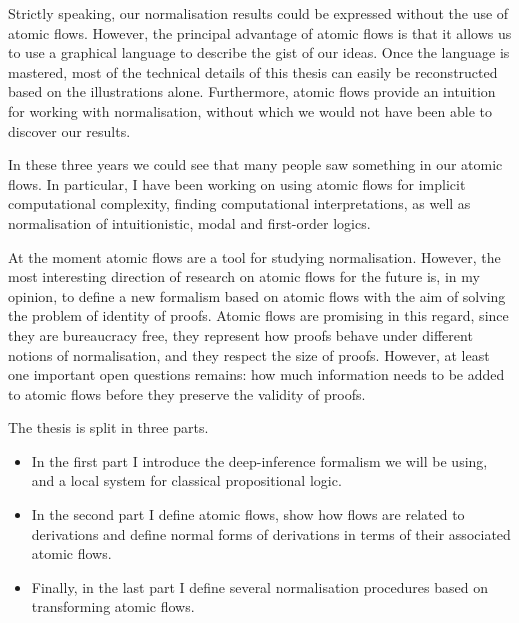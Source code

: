 Strictly speaking, our normalisation results could be expressed without the use of atomic flows. However, the principal advantage of atomic flows is that it allows us to use a graphical language to describe the gist of our ideas. Once the language is mastered, most of the technical details of this thesis can easily be reconstructed based on the illustrations alone. Furthermore, atomic flows provide an intuition for working with normalisation, without which we would not have been able to discover our results.

In these three years we could see that many people saw something in our atomic flows. In particular, I have been working on using atomic flows for implicit computational complexity, finding computational interpretations, as well as normalisation of intuitionistic, modal and first-order logics.

At the moment atomic flows are a tool for studying normalisation. However, the most interesting direction of research on atomic flows for the future is, in my opinion, to define a new formalism based on atomic flows with the aim of solving the problem of identity of proofs. Atomic flows are promising in this regard, since they are bureaucracy free, they represent how proofs behave under different notions of normalisation, and they respect the size of proofs. However, at least one important open questions remains: how much information needs to be added to atomic flows before they preserve the validity of proofs.


The thesis is split in three parts.
\begin{itemize}
\item In the first part I introduce the deep-inference formalism we will be using, and a local system for classical propositional logic.
\item In the second part I define atomic flows, show how flows are related to derivations and define normal forms of derivations in terms of their associated atomic flows.
\item Finally, in the last part I define several normalisation procedures based on transforming atomic flows.
\end{itemize}